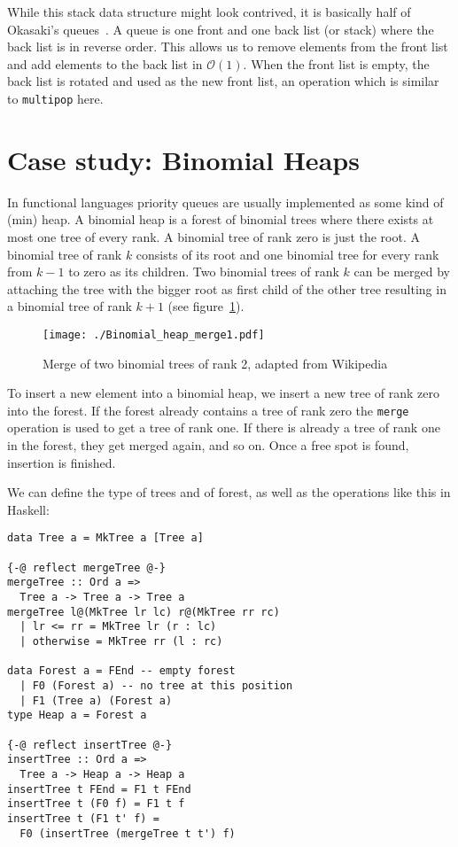 \documentclass[sigplan,screen]{acmart}
\renewcommand\O[1]{$\mathcal{O}(#1)$}
\begin{document}
While this stack data structure might look contrived, it is basically half of Okasaki's queues~\cite{okasaki}. A queue is one front and one back list (or stack) where the back list is in reverse order. This allows us to remove elements from the front list and add elements to the back list in \O{1}. When the front list is empty, the back list is rotated and used as the new front list, an operation which is similar to \texttt{multipop} here.

\section{Case study: Binomial Heaps}\label{sec:binomal_heap}

In functional languages priority queues are usually implemented as some kind of (min) heap. A binomial heap is a forest of binomial trees where there exists at most one tree of every rank. A binomial tree of rank zero is just the root. A binomial tree of rank $k$ consists of its root and one binomial tree for every rank from $k - 1$ to zero as its children. Two binomial trees of rank $k$ can be merged by attaching the tree with the bigger root as first child of the other tree resulting in a binomial tree of rank $k + 1$ (see figure~\ref{fig:heap_merge}).

\begin{figure}
\texttt{[image: ./Binomial\_heap\_merge1.pdf]}
\caption{Merge of two binomial trees of rank 2, adapted from Wikipedia~\cite{heap_merge}}\label{fig:heap_merge}
\end{figure}

To insert a new element into a binomial heap, we insert a new tree of rank zero into the forest. If the forest already contains a tree of rank zero the \texttt{merge} operation is used to get a tree of rank one. If there is already a tree of rank one in the forest, they get merged again, and so on. Once a free spot is found, insertion is finished.

We can define the type of trees and of forest, as well as the operations like this in Haskell:

\noindent
\begin{minipage}{\linewidth}
\begin{lstlisting}
data Tree a = MkTree a [Tree a]

{-@ reflect mergeTree @-}
mergeTree :: Ord a =>
  Tree a -> Tree a -> Tree a
mergeTree l@(MkTree lr lc) r@(MkTree rr rc)
  | lr <= rr = MkTree lr (r : lc)
  | otherwise = MkTree rr (l : rc)

data Forest a = FEnd -- empty forest
  | F0 (Forest a) -- no tree at this position
  | F1 (Tree a) (Forest a)
type Heap a = Forest a

{-@ reflect insertTree @-}
insertTree :: Ord a =>
  Tree a -> Heap a -> Heap a
insertTree t FEnd = F1 t FEnd
insertTree t (F0 f) = F1 t f
insertTree t (F1 t' f) =
  F0 (insertTree (mergeTree t t') f)

\end{lstlisting}
\end{minipage}
\end{document}
